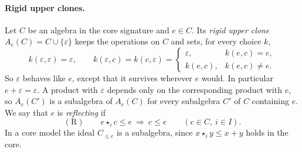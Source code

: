 \paragraph{Rigid upper clones.}
Let $C$ be an algebra in the core signature and $e\in C$. Its \emph{rigid
upper clone} $A_e(C)=C\cup\{\varepsilon\}$ keeps the operations on $C$ and
sets, for every choice $k$,
\begin{equation}\label{core:eq:five-edge-clone}
 k(\varepsilon,\varepsilon)=\varepsilon,\qquad
 k(\varepsilon,c)=k(c,\varepsilon)=
 \begin{cases}
 \varepsilon,&k(e,c)=e,\\
 k(e,c),&k(e,c)\ne e.
 \end{cases}
\end{equation}
So $\varepsilon$ behaves like $e$, except that it survives wherever $e$
would. In particular $e+\varepsilon=\varepsilon$. A product with
$\varepsilon$ depends only on the corresponding product with $e$, so
$A_e(C')$ is a subalgebra of $A_e(C)$ for every subalgebra $C'$ of $C$
containing $e$. We say that $e$ is \emph{reflecting} if
\[
 \mathrm{(R)}\qquad e\star_i c\leq e\ \Longrightarrow\ c\leq e
 \qquad(c\in C,\ i\in I).
\]
In a core model the ideal $C_{\leq e}$ is a subalgebra, since
$x\star_iy\leq x+y$ holds in the core.

